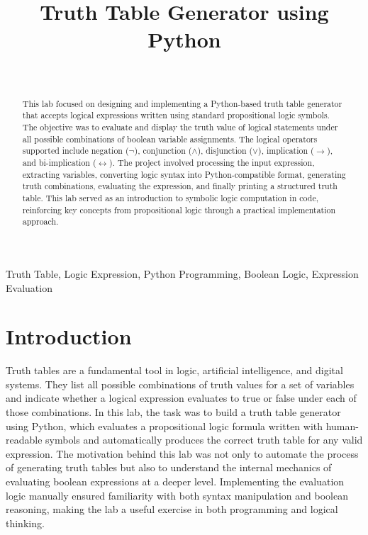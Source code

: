 \documentclass[a4paper, journal]{IEEEtran}
\begin{document}
\title{Truth Table Generator using Python}
\author{
     \\
    }





\maketitle

\begin{abstract}
    This lab focused on designing and implementing a Python-based truth table generator that accepts logical expressions written using standard propositional logic symbols. The objective was to evaluate and display the truth value of logical statements under all possible combinations of boolean variable assignments. The logical operators supported include negation ($\lnot$), conjunction ($\land$), disjunction ($\lor$), implication ($\rightarrow$), and bi-implication ($\leftrightarrow$). The project involved processing the input expression, extracting variables, converting logic syntax into Python-compatible format, generating truth combinations, evaluating the expression, and finally printing a structured truth table. This lab served as an introduction to symbolic logic computation in code, reinforcing key concepts from propositional logic through a practical implementation approach.
\end{abstract}

\begin{IEEEkeywords}
    Truth Table, Logic Expression, Python Programming, Boolean Logic, Expression Evaluation
\end{IEEEkeywords}

\section{Introduction}
Truth tables are a fundamental tool in logic, artificial intelligence, and digital systems. They list all possible combinations of truth values for a set of variables and indicate whether a logical expression evaluates to true or false under each of those combinations. In this lab, the task was to build a truth table generator using Python, which evaluates a propositional logic formula written with human-readable symbols and automatically produces the correct truth table for any valid expression. The motivation behind this lab was not only to automate the process of generating truth tables but also to understand the internal mechanics of evaluating boolean expressions at a deeper level. Implementing the evaluation logic manually ensured familiarity with both syntax manipulation and boolean reasoning, making the lab a useful exercise in both programming and logical thinking.
\end{document}
